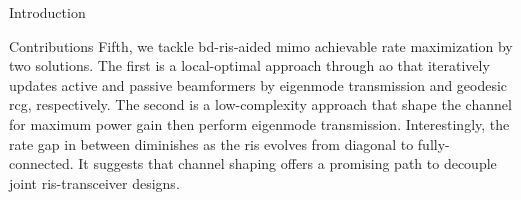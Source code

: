 \documentclass[journal]{IEEEtran}
\begin{document}
\begin{section}{Introduction}
\begin{subsection}{Contributions}
		Fifth, we tackle \gls{bd}-\gls{ris}-aided \gls{mimo} achievable rate maximization by two solutions.
		The first is a local-optimal approach through \gls{ao} that iteratively updates active and passive beamformers by eigenmode transmission and geodesic \gls{rcg}, respectively.
		The second is a low-complexity approach that shape the channel for maximum power gain then perform eigenmode transmission.
		Interestingly, the rate gap in between diminishes as the \gls{ris} evolves from diagonal to fully-connected.
		It suggests that channel shaping offers a promising path to decouple joint \gls{ris}-transceiver designs.



\end{subsection}
\end{section}
\end{document}
